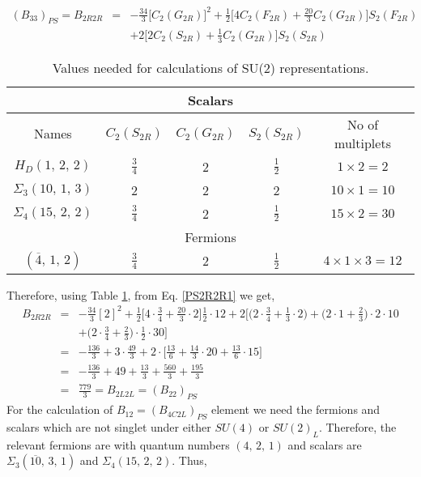 \documentclass[11pt,prd,superscriptaddress,nofootinbib]{revtex4-1}
\def\sbar{\overline}
\numberwithin{equation}{section}
\newcommand{\bea}{\begin{eqnarray}}
\newcommand{\eea}{\end{eqnarray}}
\begin{document}
\bea
\label{PS2R2R1}
(B_{33})_{PS}=B_{2R2R} &=& -\frac{34}{3}\big[C_2(G_{2R})\big]^2+\frac{1}{2}\bigg[4C_2(F_{2R})+\frac{20}{3} C_2(G_{2R})\bigg]S_2(F_{2R})\nonumber\\
&& +2\bigg[2C_2(S_{2R})+\frac{1}{3} C_2(G_{2R})\bigg]S_2(S_{2R})
\eea

\begin{table}[H]
\begin{center}
\begin{tabular}{|c|c|c|c|c|}
\hline
\multicolumn{5}{|c|}{Scalars} \\ \hline
Names &  $C_2(S_{2R})$ & $C_2(G_{2R})$ & $S_2(S_{2R})$ & No of multiplets\\  \hline\hline
$H_D(1,\,2,\,2)$ & $\frac{3}{4}$ & 2 & $\frac{1}{2}$ & $1\times 2=2$
\\ \hline
$\Sigma_3(10,\,1,\,3)$ & 2 & 2 & 2 & $10\times 1=10$
\\ \hline
$\Sigma_4(15,\,2,\,2)$ & $\frac{3}{4}$ & 2 & $\frac{1}{2}$ & $15\times 2=30$
\\ \hline\hline
\multicolumn{5}{|c|}{Fermions} \\ \hline
$(\sbar 4,\,1,\,2)$ & $\frac{3}{4}$ & 2 & $\frac{1}{2}$ & $4\times 1\times 3=12$
\\ \hline
\end{tabular}
\caption{Values needed for calculations of SU(2) representations.\label{tab:PS2R2R}}
\vspace{-0.6cm}
\end{center}
\end{table}
Therefore, using Table \ref{tab:PS2R2R}, from Eq. \ref{PS2R2R1} we get,
\bea
\label{PS2R2R}
B_{2R2R} &=& -\frac{34}{3}[2]^2+\frac{1}{2}\big[4\cdot\frac{3}{4}+\frac{20}{3}\cdot 2\big]\frac{1}{2}\cdot 12+2\bigg[\big(2\cdot \frac{3}{4}+\frac{1}{3}\cdot 2\big)+\big(2\cdot 1+\frac{2}{3}\big)\cdot 2\cdot 10 \nonumber\\
&& +\big(2\cdot\frac{3}{4}+\frac{2}{3}\big)\cdot\frac{1}{2}\cdot 30\bigg]\nonumber\\
&=& -\frac{136}{3}+3\cdot\frac{49}{3}+2\cdot \big[\frac{13}{6}+\frac{14}{3}\cdot 20+\frac{13}{6}\cdot 15\big]\nonumber\\
&=& -\frac{136}{3}+49+\frac{13}{3}+\frac{560}{3}+\frac{195}{3}\nonumber\\
&=& \boxed{\frac{779}{3}}= B_{2L2L} = (B_{22})_{PS}
\eea 
For the calculation of $B_{12}=(B_{4C2L})_{PS}$ element we need the fermions and scalars which are not singlet under either $SU(4)$ or $SU(2)_L$. Therefore, the relevant fermions are with quantum numbers $(4,\,2,\,1)$ and scalars are $\Sigma_3(\sbar {10},\,3,\,1)$ and $\Sigma_4(15,\,2,\,2)$. Thus,
\end{document}
